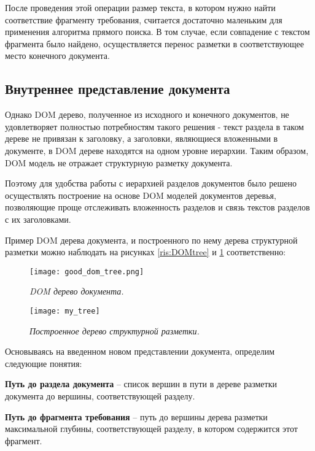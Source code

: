 После проведения этой операции размер текста, в котором нужно найти соответствие фрагменту требования, считается достаточно маленьким для применения алгоритма прямого поиска. В том случае, если совпадение с текстом фрагмента было найдено, осуществляется перенос разметки в соответствующее место конечного документа.

\subsection{Внутреннее представление документа}

Однако DOM дерево, полученное из исходного и конечного документов, не удовлетворяет полностью потребностям такого решения - текст раздела в таком дереве не привязан к заголовку, а заголовки, являющиеся вложенными в документе, в DOM дереве находятся на одном уровне иерархии. Таким образом, DOM модель не отражает структурную разметку документа.

Поэтому для удобства работы с иерархией разделов документов было решено осуществлять построение на основе DOM моделей документов деревья, позволяющие проще отслеживать вложенность разделов и связь текстов разделов с их заголовками.

Пример DOM дерева документа, и построенного по нему дерева структурной разметки можно наблюдать на рисунках \ref{ris:DOMtree} и \ref{ris:MYtree} соответственно:

\begin{figure}[h]
\begin{center}
\begin{minipage}[h]{0.55\linewidth}
\texttt{[image: good\_dom\_tree.png]}
\caption{\emph{DOM дерево документа.}} %
\label{ris:DOMtree} %
\end{minipage}
\hfill 
\begin{minipage}[h]{0.4\linewidth}
\texttt{[image: my\_tree]}
\caption{\emph{Построенное дерево структурной разметки.}}
\label{ris:MYtree}
\end{minipage}
\end{center}
\end{figure}

Основываясь на введенном новом представлении документа, определим следующие понятия:

\textbf{Путь до раздела документа} – список вершин в пути в дереве разметки документа до вершины, соответствующей разделу.

\textbf{Путь до фрагмента требования} – путь до вершины дерева разметки максимальной глубины, соответствующей разделу, в котором содержится этот фрагмент.

